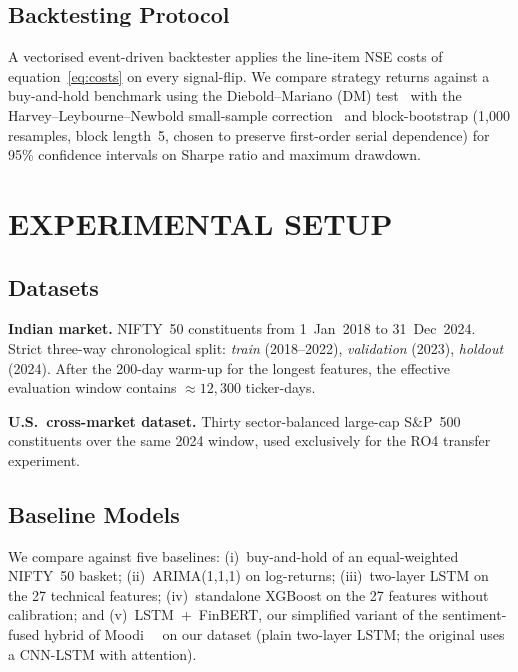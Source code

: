 \subsection{Backtesting Protocol}
\label{subsec:backtest}

A vectorised event-driven backtester applies the line-item NSE costs of
equation~\eqref{eq:costs} on every signal-flip. We
compare strategy returns against a buy-and-hold benchmark using the
Diebold--Mariano (DM) test~\cite{diebold1995comparing,harvey1997testing} with
the Harvey--Leybourne--Newbold small-sample correction~\cite{harvey1997testing}
and block-bootstrap (1{,}000 resamples, block length~5, chosen to preserve
first-order serial dependence) for 95\% confidence intervals on Sharpe ratio
and maximum drawdown.


\section{EXPERIMENTAL SETUP}
\label{sec:setup}

\subsection{Datasets}

\textbf{Indian market.} NIFTY~50 constituents from 1~Jan~2018 to
31~Dec~2024. Strict three-way chronological split: \emph{train}
(2018--2022), \emph{validation} (2023), \emph{holdout} (2024). After
the 200-day warm-up for the longest features, the effective evaluation
window contains $\approx\!12{,}300$ ticker-days.

\textbf{U.S.\ cross-market dataset.} Thirty sector-balanced large-cap
S\&P~500 constituents over the same 2024 window, used exclusively for
the RO4 transfer experiment.

\subsection{Baseline Models}

We compare against five baselines: (i)~buy-and-hold of an equal-weighted
NIFTY~50 basket; (ii)~ARIMA(1,1,1) on log-returns; (iii)~two-layer LSTM
on the 27 technical features; (iv)~standalone XGBoost on the 27 features
without calibration; and (v)~LSTM~+~FinBERT, our simplified variant of the
sentiment-fused hybrid of Moodi~\etal~\cite{moodi2024fusion} on our dataset
(plain two-layer LSTM; the original uses a CNN-LSTM with attention).

